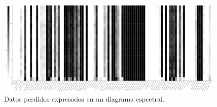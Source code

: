 \begin{figure}[!htb]
	\centering
	\includegraphics[width=1
	\linewidth]{IMAGENES/Missing_Spectrum}
	\caption{Datos perdidos expresados en un diagrama espectral.}
	\label{Missing_Spectrum}
\end{figure}

